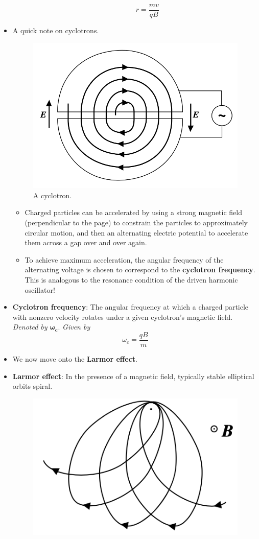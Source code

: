 \documentclass[../notes.tex]{subfiles}
\begin{document}
\begin{itemize}
\begin{itemize}
\begin{itemize}
\begin{equation*}
                r = \frac{mv}{qB}
            \end{equation*}
        \end{itemize}
    \end{itemize}
    \item A quick note on cyclotrons.
    \begin{figure}[h!]
        \centering
        \includegraphics[width=0.35\linewidth]{../ExtFiles/cyclotron.png}
        \caption{A cyclotron.}
        \label{fig:cyclotron}
    \end{figure}
    \begin{itemize}
        \item Charged particles can be accelerated by using a strong magnetic field (perpendicular to the page) to constrain the particles to approximately circular motion, and then an alternating electric potential to accelerate them across a gap over and over again.
        \item To achieve maximum acceleration, the angular frequency of the alternating voltage is chosen to correspond to the \textbf{cyclotron frequency}. This is analogous to the resonance condition of the driven harmonic oscillator!
    \end{itemize}
    \item \textbf{Cyclotron frequency}: The angular frequency at which a charged particle with nonzero velocity rotates under a given cyclotron's magnetic field. \emph{Denoted by} $\bm{\omega_c}$. \emph{Given by}
    \begin{equation*}
        \omega_c = \frac{qB}{m}
    \end{equation*}
    \item We now move onto the \textbf{Larmor effect}.
    \item \textbf{Larmor effect}: In the presence of a magnetic field, typically stable elliptical orbits spiral.
    \begin{figure}[h!]
        \centering
        \includegraphics[width=0.2\linewidth]{../ExtFiles/larmorEffect.png}

\end{figure}
\end{itemize}
\end{document}

